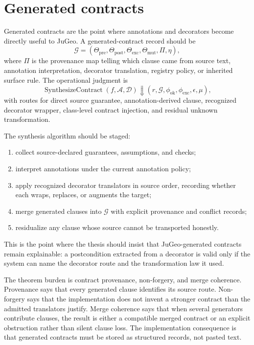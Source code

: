 \documentclass[11pt]{report}
\begin{document}
\section{Generated contracts}
Generated contracts are the point where annotations and decorators become directly useful to JuGeo. A generated-contract record should be
\[
\mathcal{G} = (\Theta_{\mathrm{pre}},\Theta_{\mathrm{post}},\Theta_{\mathrm{exc}},\Theta_{\mathrm{mut}},\Pi,\eta),
\]
where $\Pi$ is the provenance map telling which clause came from source text, annotation interpretation, decorator translation, registry policy, or inherited surface rule. The operational judgment is
\[
\operatorname{SynthesizeContract}(f,\mathcal{A},\mathcal{D}) \Downarrow (r,\mathcal{G},\phi_{\mathrm{ok}},\phi_{\mathrm{exc}},\epsilon,\mu),
\]
with routes for direct source guarantee, annotation-derived clause, recognized decorator wrapper, class-level contract injection, and residual unknown transformation.

The synthesis algorithm should be staged:
\begin{enumerate}
\item collect source-declared guarantees, assumptions, and checks;
\item interpret annotations under the current annotation policy;
\item apply recognized decorator translators in source order, recording whether each wraps, replaces, or augments the target;
\item merge generated clauses into $\mathcal{G}$ with explicit provenance and conflict records;
\item residualize any clause whose source cannot be transported honestly.
\end{enumerate}
This is the point where the thesis should insist that JuGeo-generated contracts remain explainable: a postcondition extracted from a decorator is valid only if the system can name the decorator route and the transformation law it used.

The theorem burden is contract provenance, non-forgery, and merge coherence. Provenance says that every generated clause identifies its source route. Non-forgery says that the implementation does not invent a stronger contract than the admitted translators justify. Merge coherence says that when several generators contribute clauses, the result is either a compatible merged contract or an explicit obstruction rather than silent clause loss. The implementation consequence is that generated contracts must be stored as structured records, not pasted text.
\end{document}
